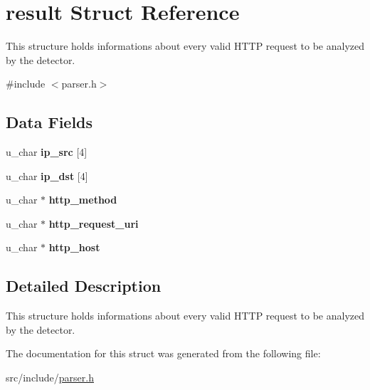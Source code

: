 \hypertarget{structresult}{}\section{result Struct Reference}
\label{structresult}


This structure holds informations about every valid H\+T\+T\+P request to be analyzed by the detector.  




{\ttfamily \#include $<$parser.\+h$>$}

\subsection*{Data Fields}
\begin{DoxyCompactItemize}
\item 
\hypertarget{structresult_a4b76a189bb5dc39c0c05045bb0ac4e3e}{}u\+\_\+char {\bfseries ip\+\_\+src} \mbox{[}4\mbox{]}\label{structresult_a4b76a189bb5dc39c0c05045bb0ac4e3e}

\item 
\hypertarget{structresult_a009030b496a0e94716f8bb1c97feee22}{}u\+\_\+char {\bfseries ip\+\_\+dst} \mbox{[}4\mbox{]}\label{structresult_a009030b496a0e94716f8bb1c97feee22}

\item 
\hypertarget{structresult_a306f5f3feb42b86aacdf862aa2b0a2d4}{}u\+\_\+char $\ast$ {\bfseries http\+\_\+method}\label{structresult_a306f5f3feb42b86aacdf862aa2b0a2d4}

\item 
\hypertarget{structresult_af49d50140ae23451f732ca42d85af139}{}u\+\_\+char $\ast$ {\bfseries http\+\_\+request\+\_\+uri}\label{structresult_af49d50140ae23451f732ca42d85af139}

\item 
\hypertarget{structresult_a8d4eb0b990e13e4440a121539cc0738b}{}u\+\_\+char $\ast$ {\bfseries http\+\_\+host}\label{structresult_a8d4eb0b990e13e4440a121539cc0738b}

\end{DoxyCompactItemize}


\subsection{Detailed Description}
This structure holds informations about every valid H\+T\+T\+P request to be analyzed by the detector. 

The documentation for this struct was generated from the following file\+:\begin{DoxyCompactItemize}
\item 
src/include/\hyperlink{parser_8h}{parser.\+h}\end{DoxyCompactItemize}
